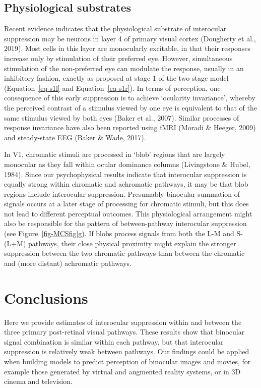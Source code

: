 \documentclass[
  letterpaper,
  DIV=11,
  numbers=noendperiod]{scrartcl}
\begin{document}
\hypertarget{physiological-substrates}{%
\subsection{Physiological substrates}\label{physiological-substrates}}

Recent evidence indicates that the physiological substrate of
interocular suppression may be neurons in layer 4 of primary visual
cortex (Dougherty et al., 2019). Most cells in this layer are
monocularly excitable, in that their responses increase only by
stimulation of their preferred eye. However, simultaneous stimulation of
the non-preferred eye can modulate the response, usually in an
inhibitory fashion, exactly as proposed at stage 1 of the two-stage
model (Equation~\ref{eq-s1l} and Equation~\ref{eq-s1r}). In terms of
perception, one consequence of this early suppression is to achieve
`ocularity invariance', whereby the perceived contrast of a stimulus
viewed by one eye is equivalent to that of the same stimulus viewed by
both eyes (Baker et al., 2007). Similar processes of response invariance
have also been reported using fMRI (Moradi \& Heeger, 2009) and
steady-state EEG (Baker \& Wade, 2017).

In V1, chromatic stimuli are processed in `blob' regions that are
largely monocular as they fall within ocular dominance columns
(Livingstone \& Hubel, 1984). Since our psychophysical results indicate
that interocular suppression is equally strong within chromatic and
achromatic pathways, it may be that blob regions include interocular
suppression. Presumably binocular summation of signals occurs at a later
stage of processing for chromatic stimuli, but this does not lead to
different perceptual outcomes. This physiological arrangement might also
be responsible for the pattern of between-pathway interocular
suppression (see Figure~\ref{fig-MCSfig}g). If blobs process signals
from both the L-M and S-(L+M) pathways, their close physical proximity
might explain the stronger suppression between the two chromatic
pathways than between the chromatic and (more distant) achromatic
pathways.

\hypertarget{conclusions}{%
\section{Conclusions}\label{conclusions}}

Here we provide estimates of interocular suppression within and between
the three primary post-retinal visual pathways. These results show that
binocular signal combination is similar within each pathway, but that
interocular suppression is relatively weak between pathways. Our
findings could be applied when building models to predict perception of
binocular images and movies, for example those generated by virtual and
augmented reality systems, or in 3D cinema and television.
\end{document}
